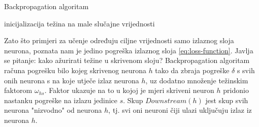 \begin{algorithm}[H]
\caption{Backpropagation algoritam}
\SetAlgoLined
 inicijalizacija težina na male slučajne vrijednosti\;
 \label{alg:backprop}
\end{algorithm}

Zato što primjeri za učenje određuju ciljne vrijednosti samo izlaznog sloja neurona, poznata nam je jedino pogreška izlaznog sloja \ref{eq:loss-function}. Javlja se pitanje: kako ažurirati težine u skrivenom sloju? Backpropagation algoritam računa pogrešku bilo kojeg skrivenog neurona $h$ tako da zbraja pogreške $\delta$ s svih onih neurona s na koje utječe izlaz neurona $h$, uz dodatno množenje težinskim faktorom $\omega_{hs}$. Faktor ukazuje na to u kojoj je mjeri skriveni neuron $h$ pridonio nastanku pogreške na izlazu jedinice $s$. Skup $Downstream(h)$ jest skup svih neurona "nizvodno" od neurona $h$, tj. svi oni neuroni čiji ulazi uključuju izlaz iz neurona $h$.